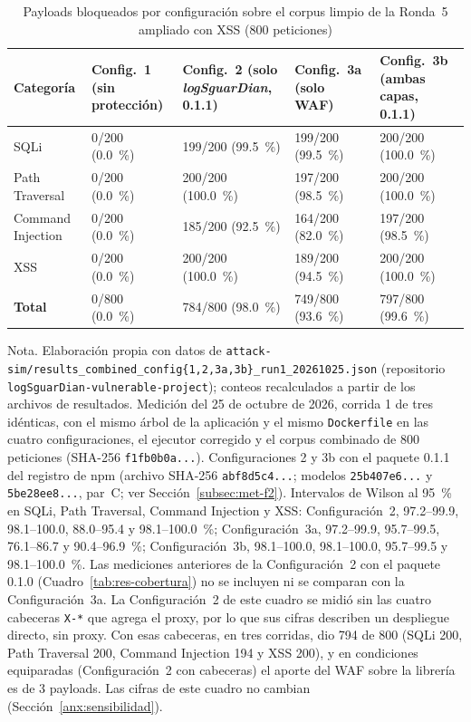 \begin{table}[H]
\centering
\small
\begin{tabular}{|L{2.7cm}|L{2.0cm}|L{2.6cm}|L{2.6cm}|L{2.6cm}|}
\hline
\textbf{Categoría} & \textbf{Config.~1 (sin protección)} & \textbf{Config.~2 (solo \textit{logSguarDian}, 0.1.1)} & \textbf{Config.~3a (solo WAF)} & \textbf{Config.~3b (ambas capas, 0.1.1)} \\ \hline
SQLi & 0/200 (0.0~\%) & 199/200 (99.5~\%) & 199/200 (99.5~\%) & 200/200 (100.0~\%) \\ \hline
Path Traversal & 0/200 (0.0~\%) & 200/200 (100.0~\%) & 197/200 (98.5~\%) & 200/200 (100.0~\%) \\ \hline
Command Injection & 0/200 (0.0~\%) & 185/200 (92.5~\%) & 164/200 (82.0~\%) & 197/200 (98.5~\%) \\ \hline
XSS & 0/200 (0.0~\%) & 200/200 (100.0~\%) & 189/200 (94.5~\%) & 200/200 (100.0~\%) \\ \hline
\textbf{Total} & 0/800 (0.0~\%) & 784/800 (98.0~\%) & 749/800 (93.6~\%) & 797/800 (99.6~\%) \\ \hline
\end{tabular}
\caption[Cuatro configuraciones sobre el corpus limpio de la Ronda 5 con XSS]{Payloads bloqueados por configuración sobre el corpus limpio de la Ronda~5 ampliado con XSS (800 peticiones)}
\label{tab:res-ronda5}
\end{table}
{\footnotesize Nota. Elaboración propia con datos de
\texttt{attack-sim/results\_combined\_config\{1,2,3a,3b\}\_run1\_20261025.json} (repositorio
\texttt{logSguarDian-vulnerable-project}); conteos recalculados a partir de los archivos de
resultados. Medición del 25 de octubre de 2026, corrida 1 de tres idénticas, con el mismo árbol de
la aplicación y el mismo \texttt{Dockerfile} en las cuatro configuraciones, el ejecutor corregido y
el corpus combinado de 800 peticiones (SHA-256 \texttt{f1fb0b0a...}). Configuraciones 2 y 3b con el
paquete 0.1.1 del registro de npm (archivo SHA-256 \texttt{abf8d5c4...}; modelos \texttt{25b407e6...}
y \texttt{5be28ee8...}, par~C; ver Sección~\ref{subsec:met-f2}). Intervalos de Wilson al 95~\% en
SQLi, Path Traversal, Command Injection y XSS: Configuración~2, 97.2--99.9, 98.1--100.0,
88.0--95.4 y 98.1--100.0~\%; Configuración~3a, 97.2--99.9, 95.7--99.5, 76.1--86.7 y 90.4--96.9~\%;
Configuración~3b, 98.1--100.0, 98.1--100.0, 95.7--99.5 y 98.1--100.0~\%. Las mediciones anteriores
de la Configuración~2 con el paquete 0.1.0 (Cuadro~\ref{tab:res-cobertura}) no se incluyen ni se
comparan con la Configuración~3a. La Configuración~2 de este cuadro se midió sin las
cuatro cabeceras \texttt{X-*} que agrega el proxy, por lo que sus cifras describen un despliegue
directo, sin proxy. Con esas cabeceras, en tres corridas, dio 794 de 800 (SQLi 200, Path Traversal
200, Command Injection 194 y XSS 200), y en condiciones equiparadas (Configuración~2 con cabeceras)
el aporte del WAF sobre la librería es de 3 payloads. Las cifras de este cuadro no cambian
(Sección~\ref{anx:sensibilidad}).}

